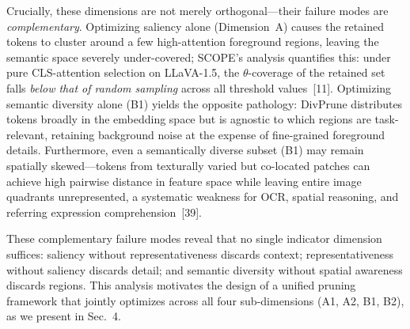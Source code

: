 \documentclass[10pt,letterpaper]{article}
\begin{document}
Crucially, these dimensions are not merely orthogonal---their failure modes are
\emph{complementary}.
Optimizing saliency alone (Dimension~A) causes the retained tokens to cluster
around a few high-attention foreground regions, leaving the semantic space
severely under-covered; SCOPE's analysis quantifies this: under pure
CLS-attention selection on LLaVA-1.5, the $\theta$-coverage of the retained
set falls \emph{below that of random sampling} across all threshold
values~[11].
Optimizing semantic diversity alone (B1) yields the opposite pathology:
DivPrune distributes tokens broadly in the embedding space but is agnostic to
which regions are task-relevant, retaining background noise at the expense of
fine-grained foreground details.
Furthermore, even a semantically diverse subset (B1) may remain spatially
skewed---tokens from texturally varied but co-located patches can achieve high
pairwise distance in feature space while leaving entire image quadrants
unrepresented, a systematic weakness for OCR, spatial reasoning, and referring
expression comprehension~[39].

These complementary failure modes reveal that no single indicator dimension
suffices: saliency without representativeness discards context;
representativeness without saliency discards detail; and semantic diversity
without spatial awareness discards regions.
This analysis motivates the design of a unified pruning framework that jointly
optimizes across all four sub-dimensions (A1, A2, B1, B2), as we present in
Sec.~4.
\end{document}

